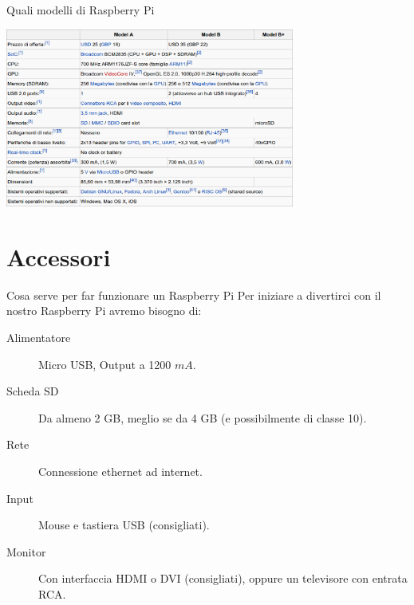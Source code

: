 \documentclass[xcolor=svgnames,11pt]{beamer}
\begin{document}
\begin{frame}{Quali modelli di Raspberry Pi}
\begin{center}
\includegraphics[width=9.5cm]{table.png}
\end{center}
\end{frame}

\section{Accessori}

\begin{frame}{Cosa serve per far funzionare un Raspberry Pi}
Per iniziare a divertirci con il nostro Raspberry Pi avremo bisogno di:
\pause
\begin{description}
\item[{\color{green_raspi} Alimentatore}] Micro USB, Output a 1200 $mA$.
\pause
\item[{\color{green_raspi} Scheda SD}] Da almeno 2 GB, meglio se da 4 GB (e possibilmente di classe 10).
\pause
\item[{\color{green_raspi} Rete}] Connessione ethernet ad internet.
\pause
\item[{\color{green_raspi} Input}] Mouse e tastiera USB (consigliati).
\pause
\item[{\color{green_raspi} Monitor}] Con interfaccia HDMI o DVI (consigliati), oppure un televisore con entrata RCA.
\end{description}
\end{frame}
\end{document}

